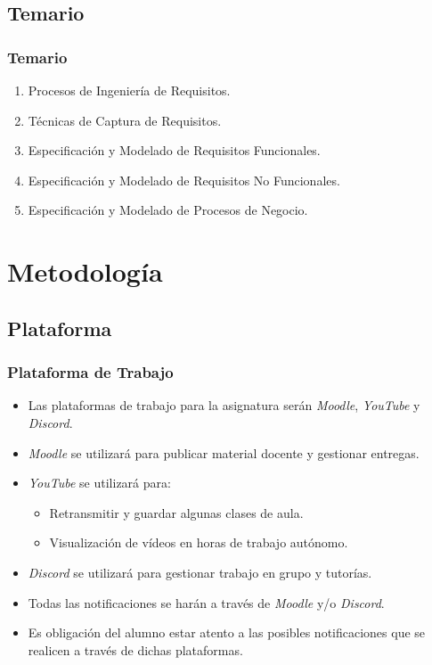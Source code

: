 \documentclass[a4paper,slidestop,xcolor=pst,dvips,blue]{beamer}
\begin{document}
\subsection{Temario}

\begin{frame}[c]
	\frametitle{Temario}
	\begin{enumerate}[<+->]
		\item Procesos de Ingeniería de Requisitos.
		\item Técnicas de Captura de Requisitos.
		\item Especificación y Modelado de Requisitos Funcionales.
		\item Especificación y Modelado de Requisitos No Funcionales.
		\item Especificación y Modelado de Procesos de Negocio.
	\end{enumerate}
\end{frame}

\section{Metodología}

\subsection{Plataforma}

\begin{frame}[c]
	\frametitle{Plataforma de Trabajo}
	\begin{itemize}[<+->]
		\item Las plataformas de trabajo para la asignatura serán \emph{Moodle}, \emph{YouTube} y \emph{Discord}.
		\item \emph{Moodle} se utilizará para publicar material docente y gestionar entregas.
		\item \emph{YouTube} se utilizará para:
			\begin{itemize}[<+->] 
				\item Retransmitir y guardar algunas clases de aula.
				\item Visualización de vídeos en horas de trabajo autónomo.
			 \end{itemize}
		\item \emph{Discord} se utilizará para gestionar trabajo en grupo y tutorías.
		\item Todas las notificaciones se harán a través de \emph{Moodle} y/o \emph{Discord}.
		\item Es obligación del alumno estar atento a las posibles notificaciones que se realicen a través de dichas plataformas.
	\end{itemize}
\end{frame}
\end{document}
